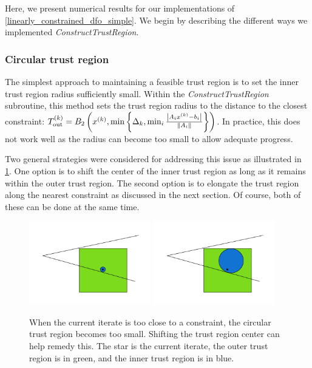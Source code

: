 Here, we present numerical results for our implementations of \cref{linearly_constrained_dfo_simple}.
We begin by describing the different ways we implemented \emph{ConstructTrustRegion}.

\subsubsection{Circular trust region}

The simplest approach to maintaining a feasible trust region is to set the inner trust region radius sufficiently small.
Within the \emph{ConstructTrustRegion} subroutine, this method sets the trust region radius to the distance to the closest constraint:
${T_{\text{out}}^{(k)}} = B_2\left(x^{(k)}, \min\left\{\Delta_k, \min_{i}\frac{\left|A_ix^{(k)} - b_i\right|}{\left\|A_i\right\|} \right\}\right)$.
In practice, this does not work well as the radius can become too small to allow adequate progress.

Two general strategies were considered for addressing this issue as illustrated in \cref{options_basis}.
One option is to shift the center of the inner trust region as long as it remains within the outer trust region.
The second option is to elongate the trust region along the nearest constraint as discussed in the next section.
Of course, both of these can be done at the same time.


\begin{figure}[ht]
    \centering
    \includegraphics[width=200px]{images/small_circle.png}
    \includegraphics[width=200px]{images/shifted_center.png}
    \caption[The advantage of not requiring the sample region center to be the trust region center.]{
    	When the current iterate is too close to a constraint, the circular trust region becomes too small.
    	Shifting the trust region center can help remedy this.
    	The star is the current iterate, the outer trust region is in green, and the inner trust region is in blue.
    }
    \label{options_basis}
\end{figure}


